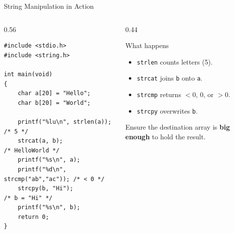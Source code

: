 \documentclass[aspectratio=169]{beamer}
\begin{document}
	\begin{frame}[fragile]{String Manipulation in Action}
		\begin{columns}[T]
			\begin{column}{0.56\textwidth}
				\begin{lstlisting}
#include <stdio.h>
#include <string.h>

int main(void)
{
    char a[20] = "Hello";
    char b[20] = "World";

    printf("%lu\n", strlen(a));  /* 5 */
    strcat(a, b);                /* HelloWorld */
    printf("%s\n", a);
    printf("%d\n", strcmp("ab","ac")); /* < 0 */
    strcpy(b, "Hi");             /* b = "Hi" */
    printf("%s\n", b);
    return 0;
}
				\end{lstlisting}
			\end{column}
			\begin{column}{0.44\textwidth}
				\begin{block}{What happens}
					\small
					\begin{itemize}
						\item \texttt{strlen} counts letters (5).
						\item \texttt{strcat} joins \texttt{b} onto \texttt{a}.
						\item \texttt{strcmp} returns $<0$, $0$, or $>0$.
						\item \texttt{strcpy} overwrites \texttt{b}.
					\end{itemize}
				\end{block}
				\centering\footnotesize Ensure the destination array is \textbf{big enough} to hold the result.
			\end{column}
		\end{columns}
	\end{frame}
\end{document}
